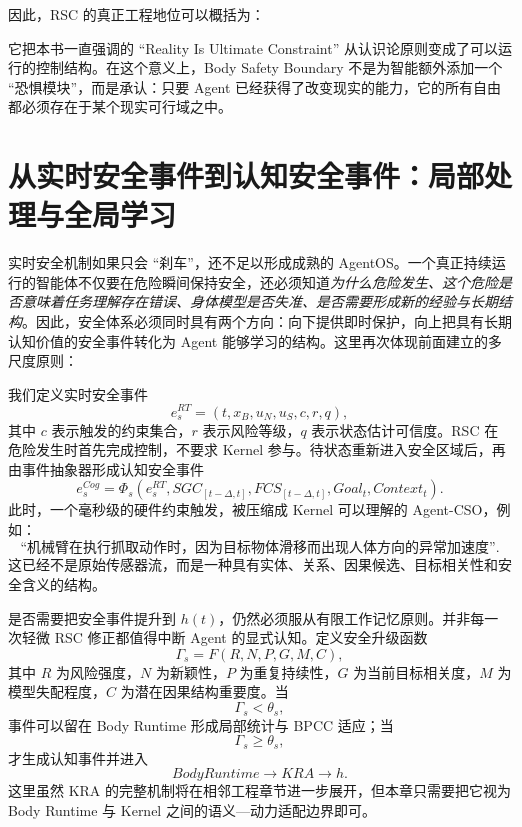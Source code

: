 因此，RSC 的真正工程地位可以概括为：
\begin{statementbox}
\centering
{}
\end{statementbox}
它把本书一直强调的 ``Reality Is Ultimate Constraint'' 从认识论原则变成了可以运行的控制结构。在这个意义上，Body Safety Boundary 不是为智能额外添加一个 ``恐惧模块''，而是承认：只要 Agent 已经获得了改变现实的能力，它的所有自由都必须存在于某个现实可行域之中。

\section{从实时安全事件到认知安全事件：局部处理与全局学习}

实时安全机制如果只会 ``刹车''，还不足以形成成熟的 AgentOS。一个真正持续运行的智能体不仅要在危险瞬间保持安全，还必须知道\emph{为什么危险发生、这个危险是否意味着任务理解存在错误、身体模型是否失准、是否需要形成新的经验与长期结构}。因此，安全体系必须同时具有两个方向：向下提供即时保护，向上把具有长期认知价值的安全事件转化为 Agent 能够学习的结构。这里再次体现前面建立的多尺度原则：
\begin{statementbox}
\centering
{}
\end{statementbox}

我们定义实时安全事件
\[
e_s^{RT}
=
(
t,
x_B,
u_N,
u_S,
c,
r,
q
),
\]
其中 $c$ 表示触发的约束集合，$r$ 表示风险等级，$q$ 表示状态估计可信度。RSC 在危险发生时首先完成控制，不要求 Kernel 参与。待状态重新进入安全区域后，再由事件抽象器形成认知安全事件
\[
e_s^{Cog}
=
\Phi_s
(
e_s^{RT},
SGC_{[t-\Delta,t]},
FCS_{[t-\Delta,t]},
Goal_t,
Context_t
).
\]
此时，一个毫秒级的硬件约束触发，被压缩成 Kernel 可以理解的 Agent-CSO，例如：
\[
\text{``机械臂在执行抓取动作时，因为目标物体滑移而出现人体方向的异常加速度''}.
\]
这已经不是原始传感器流，而是一种具有实体、关系、因果候选、目标相关性和安全含义的结构。

是否需要把安全事件提升到 $h(t)$，仍然必须服从有限工作记忆原则。并非每一次轻微 RSC 修正都值得中断 Agent 的显式认知。定义安全升级函数
\[
\Gamma_s
=
F(
R,
N,
P,
G,
M,
C
),
\]
其中 $R$ 为风险强度，$N$ 为新颖性，$P$ 为重复持续性，$G$ 为当前目标相关度，$M$ 为模型失配程度，$C$ 为潜在因果结构重要度。当
\[
\Gamma_s<\theta_s,
\]
事件可以留在 Body Runtime 形成局部统计与 BPCC 适应；当
\[
\Gamma_s\geq\theta_s,
\]
才生成认知事件并进入
\[
BodyRuntime
\rightarrow
KRA
\rightarrow
h.
\]
这里虽然 KRA 的完整机制将在相邻工程章节进一步展开，但本章只需要把它视为 Body Runtime 与 Kernel 之间的语义—动力适配边界即可。

